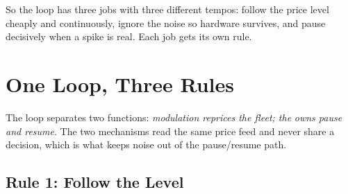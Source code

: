 So the loop has three jobs with three different tempos: follow the price level cheaply and continuously, ignore the noise so hardware survives, and pause decisively when a spike is real. Each job gets its own rule.

\section{One Loop, Three Rules}
\label{sec:threerules}

The loop separates two functions: \emph{modulation reprices the fleet; the}  \emph{owns pause and resume}. The two mechanisms read the same price feed and never share a decision, which is what keeps noise out of the pause/resume path.

\subsection{Rule 1: Follow the Level}

